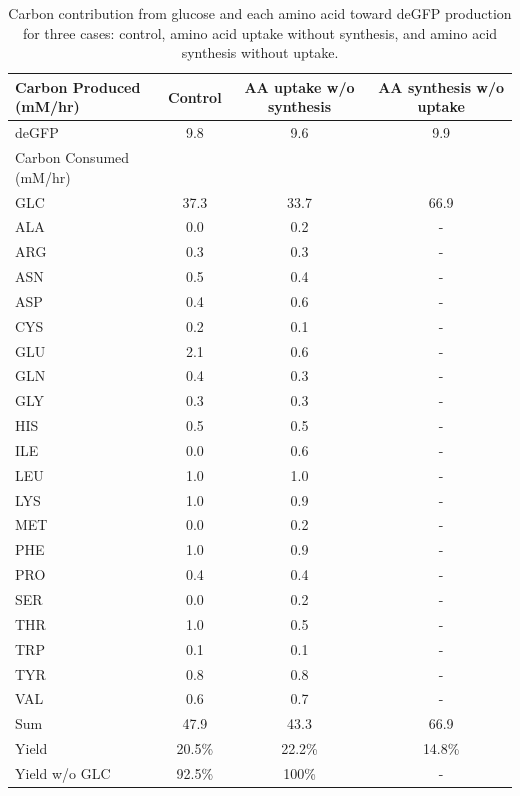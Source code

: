 \documentclass[journal=asbcd6,manuscript=article]{achemso}
\begin{document}
\begin{table}[t!]
\centering
    \caption{Carbon contribution from glucose and each amino acid toward deGFP production for three cases: control, amino acid uptake without synthesis, and amino acid synthesis without uptake.}
    \renewcommand{\arraystretch}{0.9}
    \begin{tabular}{lccc} \toprule
        \parbox{3.3 cm}{Carbon \phantom{abcdefghi} Produced (mM/hr)} & Control & \parbox{2.6 cm}{AA uptake \phantom{ai} w/o synthesis} & \parbox{2.5 cm}{AA synthesis w/o uptake} \\ \midrule
        deGFP & 9.8 & 9.6 & 9.9  \\ \toprule
        \parbox{3.3 cm}{Carbon \phantom{abcdefghi} Consumed (mM/hr)} & \\ \midrule
        GLC & 37.3 & 33.7 & 66.9 \\
        ALA & 0.0 & 0.2 & - \\
        ARG & 0.3 & 0.3 & - \\
        ASN & 0.5 & 0.4 & - \\
        ASP & 0.4 & 0.6 & - \\
        CYS & 0.2 & 0.1 & - \\
        GLU & 2.1 & 0.6 & - \\
        GLN & 0.4 & 0.3 & - \\
        GLY & 0.3 & 0.3 & - \\
        HIS & 0.5 & 0.5 & - \\
        ILE & 0.0 & 0.6 & - \\
        LEU & 1.0 & 1.0 & - \\
        LYS & 1.0 & 0.9 & - \\
		MET & 0.0 & 0.2 & - \\
        PHE & 1.0 & 0.9 & - \\
        PRO & 0.4 & 0.4 & - \\
        SER & 0.0 & 0.2 & - \\
        THR & 1.0 & 0.5 & - \\
        TRP & 0.1 & 0.1 & - \\
        TYR & 0.8 & 0.8 & - \\
        VAL & 0.6 & 0.7 & - \\ \hline
        Sum & 47.9 & 43.3 & 66.9 \\ \toprule
        Yield & 20.5\% & 22.2\% & 14.8\% \\
	Yield w/o GLC & 92.5\% & 100\% & - \\ \bottomrule
    \end{tabular}
\label{tbl:yield_breakdown}
\end{table}
\end{document}
